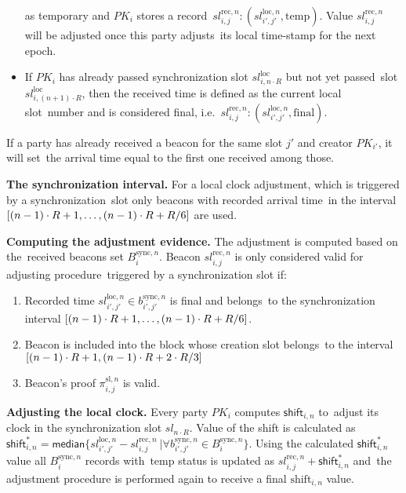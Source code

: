 \begin{legal}
\begin{itemize}
        as temporary and $PK_i$ stores a record\
        ${{sl^{\text{rec}, n}_{i, j}}: (sl_{i', j'}^{\text{loc}, n}, \text{temp})}$.
        Value ${{sl^{\text{rec}, n}_{i, j}}}$ will be adjusted once this party adjusts\
        its local time-stamp for the next epoch.
        \item If $PK_i$ has already passed synchronization slot $sl_{i, n \cdot R}^{\text{loc}}$ but not yet passed\
        slot $sl_{i, (n + 1) \cdot R}^{\text{loc}}$, then the received time is defined as the current local slot\
        number and is considered final, i.e.\
        ${{sl^{\text{rec}, n}_{i, j}}: (sl_{i', j'}^{\text{loc}, n}, \text{final})}$.
    \end{itemize}
    If a party has already received a beacon for the same slot $j'$ and creator $PK_{i'}$, it will set\
    the arrival time equal to the first one received among those.
    \item[]\textbf{The synchronization interval.} For a local clock adjustment, which is triggered by a synchronization\
    slot only beacons with recorded arrival time\
    in the interval ${[(n - 1) \cdot R + 1,\dots,(n-1) \cdot R + R \// 6]}$ are used.
    \item[]\textbf{Computing the adjustment evidence.} The adjustment is computed based on the\
    received beacons set $B_i^{\text{sync}, n}$.
    Beacon ${sl^{\text{rec}, n}_{i, j}}$ is only considered valid for adjusting procedure\
    triggered by a synchronization slot if:
    \begin{enumerate}
        \item Recorded time ${sl_{i', j'}^{\text{loc}, n} \in b_{i', j'}^{\text{sync}, n}}$ is final and belongs\
        to the synchronization interval ${[(n - 1) \cdot R + 1,\dots,(n-1) \cdot R + R \// 6]}$.
        \item Beacon is included into the block whose creation slot belongs\
        to the interval ${[(n - 1) \cdot R + 1, (n - 1) \cdot R + 2 \cdot R \// 3]}$
        \item Beacon's proof $\pi_{i, j}^{\text{sl}, n}$ is valid.
    \end{enumerate}
    \item[]\textbf{Adjusting the local clock.} Every party $PK_i$ computes $\textsf{shift}_{i, n}$ to\
    adjust its clock in the synchronization slot $sl_{n \cdot R}$.
    Value of the shift is calculated as\
    ${\textsf{shift}^*_{i, n} = \textsf{median} \{sl_{i', j'}^{\text{loc}, n} - sl^{\text{rec}, n}_{i, j}\
    | \forall b_{i', j'}^{\text{sync}, n} \in B_i^{\text{sync}, n}\}}$.
    Using the calculated ${\textsf{shift}^*_{i, n}}$ value all $B_i^{\text{sync}, n}$ records with\
    $\text{temp}$ status is updated as ${sl^{\text{rec}, n}_{i, j} + \textsf{shift}^*_{i, n}}$ and\
    the adjustment procedure is performed again to receive a final $\text{shift}_{i, n}$ value.
\end{legal}


